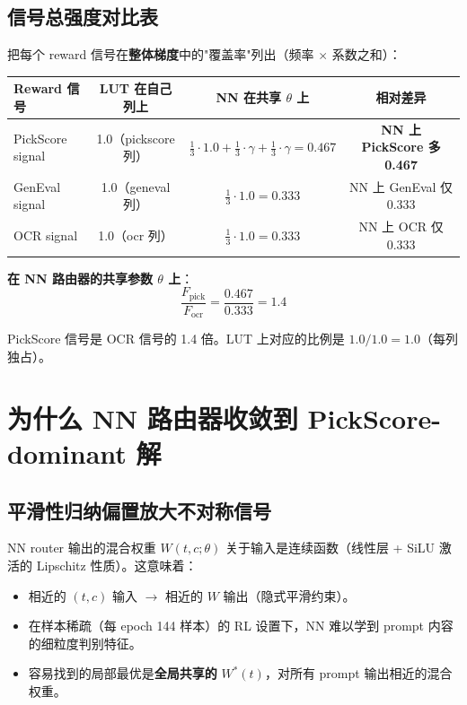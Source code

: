 \documentclass[11pt,a4paper]{article}
\begin{document}
\subsection{信号总强度对比表}

把每个 reward 信号在\textbf{整体梯度}中的"覆盖率"列出（频率 $\times$ 系数之和）：

\begin{center}
\begin{tabular}{l|c|c|c}
\toprule
\textbf{Reward 信号} & \textbf{LUT 在自己列上} & \textbf{NN 在共享 $\theta$ 上} & \textbf{相对差异} \\
\midrule
PickScore signal &
    1.0（pickscore 列） &
    $\tfrac{1}{3}{\cdot}1.0 + \tfrac{1}{3}{\cdot}\gamma + \tfrac{1}{3}{\cdot}\gamma = 0.467$ &
    \textbf{NN 上 PickScore 多 0.467} \\
\midrule
GenEval signal &
    1.0（geneval 列） &
    $\tfrac{1}{3}{\cdot}1.0 = 0.333$ &
    NN 上 GenEval 仅 0.333 \\
\midrule
OCR signal &
    1.0（ocr 列） &
    $\tfrac{1}{3}{\cdot}1.0 = 0.333$ &
    NN 上 OCR 仅 0.333 \\
\bottomrule
\end{tabular}
\end{center}

\textbf{在 NN 路由器的共享参数 $\theta$ 上}：
\begin{equation}
\frac{F_{\text{pick}}}{F_{\text{ocr}}} = \frac{0.467}{0.333} = 1.4
\label{eq:signal_ratio}
\end{equation}

PickScore 信号是 OCR 信号的 1.4 倍。LUT 上对应的比例是 $1.0/1.0 = 1.0$（每列独占）。

\section{为什么 NN 路由器收敛到 PickScore-dominant 解}

\subsection{平滑性归纳偏置放大不对称信号}

NN router 输出的混合权重 $W(t, c; \theta)$ 关于输入是连续函数（线性层 + SiLU 激活的 Lipschitz 性质）。这意味着：

\begin{itemize}
    \item 相近的 $(t, c)$ 输入 $\to$ 相近的 $W$ 输出（隐式平滑约束）。
    \item 在样本稀疏（每 epoch 144 样本）的 RL 设置下，NN 难以学到 prompt 内容的细粒度判别特征。
    \item 容易找到的局部最优是\textbf{全局共享的} $W^*(t)$，对所有 prompt 输出相近的混合权重。
\end{itemize}
\end{document}
